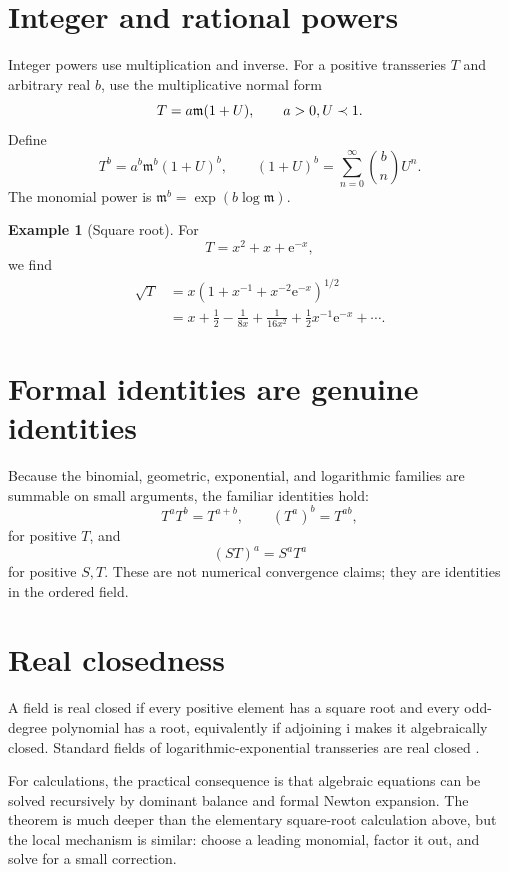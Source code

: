 \documentclass[11pt,oneside]{book}
\theoremstyle{definition}
\newtheorem{example}[theorem]{Example}
\theoremstyle{remark}
\newcommand{\m}{\mathfrak{m}}
\newcommand{\e}{\mathrm{e}}
\newcommand{\precdom}{\prec}
\begin{document}
\section{Integer and rational powers}

Integer powers use multiplication and inverse. For a positive transseries $T$
and arbitrary real $b$, use the multiplicative normal form
\[
  T=a\m(1+U),\qquad a>0,\\ U\precdom1.
\]
Define
\begin{equation}
  T^b=a^b\m^b(1+U)^b,
  \qquad
  (1+U)^b=\sum_{n=0}^{\infty}\binom{b}{n}U^n.
  \label{eq:real-power-definition}
\end{equation}
The monomial power is $\m^b=\exp(b\log\m)$.

\begin{example}[Square root]
For
\[
  T=x^2+x+\e^{-x},
\]
we find
\begin{align*}
  \sqrt{T}
  &=x\left(1+x^{-1}+x^{-2}\e^{-x}\right)^{1/2}\\
  &=x+\frac12-\frac{1}{8x}+\frac{1}{16x^2}
    +\frac12x^{-1}\e^{-x}+\cdots.
\end{align*}
\end{example}

\section{Formal identities are genuine identities}

Because the binomial, geometric, exponential, and logarithmic families are
summable on small arguments, the familiar identities hold:
\[
  T^aT^b=T^{a+b},\qquad (T^a)^b=T^{ab},
\]
for positive $T$, and
\[
  (ST)^a=S^aT^a
\]
for positive $S,T$. These are not numerical convergence claims; they are
identities in the ordered field.

\section{Real closedness}

A field is real closed if every positive element has a square root and every
odd-degree polynomial has a root, equivalently if adjoining $\mathrm{i}$ makes
it algebraically closed. Standard fields of logarithmic-exponential transseries
are real closed \cite{vanDerHoevenBook,ADHBook}.

For calculations, the practical consequence is that algebraic equations can be
solved recursively by dominant balance and formal Newton expansion. The theorem
is much deeper than the elementary square-root calculation above, but the local
mechanism is similar: choose a leading monomial, factor it out, and solve for a
small correction.
\end{document}
